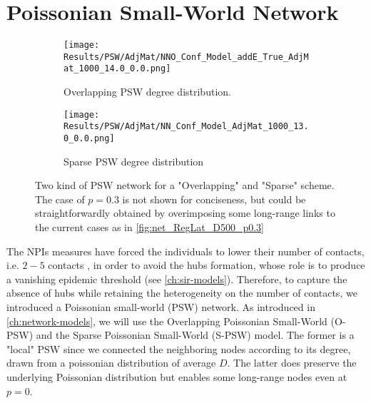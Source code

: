 \documentclass[a4paper,10pt,twoside]{book} %
\theoremstyle{definition}
\begin{document}
\section{Poissonian Small-World Network}
\thispagestyle{empty}
\label{sec:res_PSW}
\begin{figure}[ht]
    \begin{subfigure}{.45\linewidth}
        \texttt{[image: Results/PSW/AdjMat/NNO\_Conf\_Model\_addE\_True\_AdjMat\_1000\_14.0\_0.0.png]}
        \centering
        \caption{Overlapping PSW degree distribution. }
        \label{fig:net_O-PSW}
    \end{subfigure}
	\hfill
	\begin{subfigure}{.45\linewidth}
        \texttt{[image: Results/PSW/AdjMat/NN\_Conf\_Model\_AdjMat\_1000\_13.0\_0.0.png]}
        \centering
        \caption{Sparse PSW degree distribution}
        \label{fig:net_S-PSW}
    \end{subfigure}
	\caption{Two kind of PSW network for a "Overlapping" and "Sparse" scheme. The case of $p = 0.3$ is not shown for conciseness, but could be straightforwardly obtained by overimposing some long-range links to the current cases as in \autoref{fig:net_RegLat_D500_p0.3}}
\end{figure}
The NPIs measures have forced the individuals to lower their number of contacts, i.e. $2-5$ contacts \cite{Liu::2021_Review_SContactPattern}, in order to avoid the hubs formation, whose role is to produce a vanishing epidemic threshold (see \autoref{ch:sir-models}).
Therefore, to capture the absence of hubs while retaining the heterogeneity on the number of contacts, we introduced a Poissonian small-world (PSW) network.
As introduced in \autoref{ch:network-models}, we will use the Overlapping Poissonian Small-World (O-PSW) and the Sparse Poissonian Small-World (S-PSW) model. The former is a "local" PSW since we connected the neighboring nodes according to its degree, drawn from a poissonian distribution of average $ D$. The latter does preserve the underlying Poissonian distribution but enables some long-range nodes even at $ p = 0$. 
\end{document}
